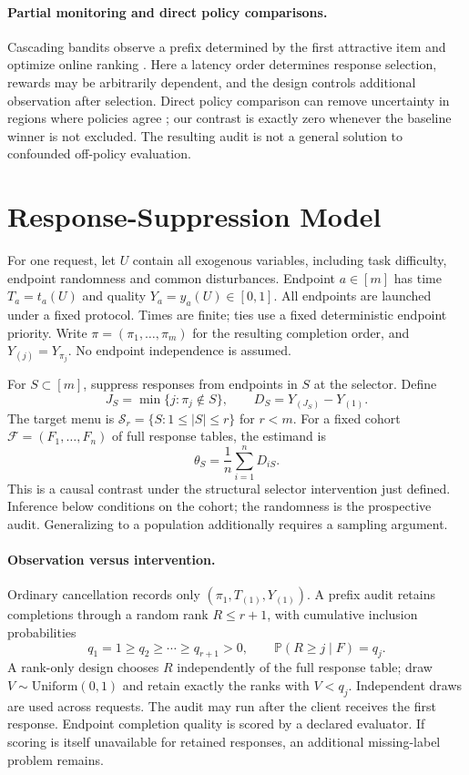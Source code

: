 \documentclass[12pt]{clear2027}
\newcommand{\Prb}{\mathbb{P}}
\newcommand{\calS}{\mathcal{S}}
\begin{document}
\paragraph{Partial monitoring and direct policy comparisons.}
Cascading bandits observe a prefix determined by the first attractive item and optimize online ranking \citep{kveton2015}. Here a latency order determines response selection, rewards may be arbitrarily dependent, and the design controls additional observation after selection. Direct policy comparison can remove uncertainty in regions where policies agree \citep{guerdan2024}; our contrast is exactly zero whenever the baseline winner is not excluded. The resulting audit is not a general solution to confounded off-policy evaluation.

\section{Response-Suppression Model}
For one request, let $U$ contain all exogenous variables, including task difficulty, endpoint randomness and common disturbances. Endpoint $a\in[m]$ has time $T_a=t_a(U)$ and quality $Y_a=y_a(U)\in[0,1]$. All endpoints are launched under a fixed protocol. Times are finite; ties use a fixed deterministic endpoint priority. Write $\pi=(\pi_1,\ldots,\pi_m)$ for the resulting completion order, and $Y_{(j)}=Y_{\pi_j}$. No endpoint independence is assumed.

For $S\subset[m]$, suppress responses from endpoints in $S$ at the selector. Define
\begin{equation}
 J_S=\min\{j:\pi_j\notin S\},\qquad
 D_S=Y_{(J_S)}-Y_{(1)}.\label{eq:target}
\end{equation}
The target menu is $\calS_r=\{S:1\le |S|\le r\}$ for $r<m$. For a fixed cohort $\mathcal F=(F_1,\ldots,F_n)$ of full response tables, the estimand is
\begin{equation}
 \theta_S=\frac1n\sum_{i=1}^n D_{iS}.\label{eq:cohort}
\end{equation}
This is a causal contrast under the structural selector intervention just defined. Inference below conditions on the cohort; the randomness is the prospective audit. Generalizing to a population additionally requires a sampling argument.

\paragraph{Observation versus intervention.}
Ordinary cancellation records only $(\pi_1,T_{(1)},Y_{(1)})$. A prefix audit retains completions through a random rank $R\le r+1$, with cumulative inclusion probabilities
\begin{equation}
 q_1=1\ge q_2\ge\cdots\ge q_{r+1}>0,\qquad
 \Prb(R\ge j\mid F)=q_j.\label{eq:q}
\end{equation}
A rank-only design chooses $R$ independently of the full response table; draw $V\sim\mathrm{Uniform}(0,1)$ and retain exactly the ranks with $V<q_j$. Independent draws are used across requests. The audit may run after the client receives the first response. Endpoint completion quality is scored by a declared evaluator. If scoring is itself unavailable for retained responses, an additional missing-label problem remains.
\end{document}
